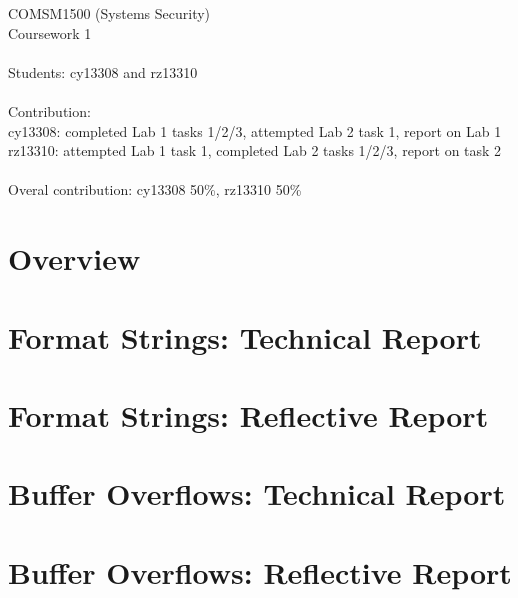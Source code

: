 \documentclass[11pt, onecolumn]{article}
\newcommand\tab[1][1cm]{\hspace*{#1}}
\begin{document}
COMSM1500 (Systems Security)\\
Coursework 1\\
\\
Students: cy13308 and rz13310 \\
\\
Contribution: \\
\tab[1cm] cy13308: completed Lab 1 tasks 1/2/3, attempted Lab 2 task 1, report on Lab 1\\
\tab[1cm] rz13310: attempted Lab 1 task 1, completed Lab 2 tasks 1/2/3, report on task 2
\\
\\
Overal contribution: cy13308 50\%, rz13310 50\%
\newpage


\section{Overview}


\newpage
\section{Format Strings: Technical Report}


\newpage
\section{Format Strings: Reflective Report}


\newpage
\section{Buffer Overflows: Technical Report}


\newpage
\section{Buffer Overflows: Reflective Report}



\newpage
{}

\end{document}
